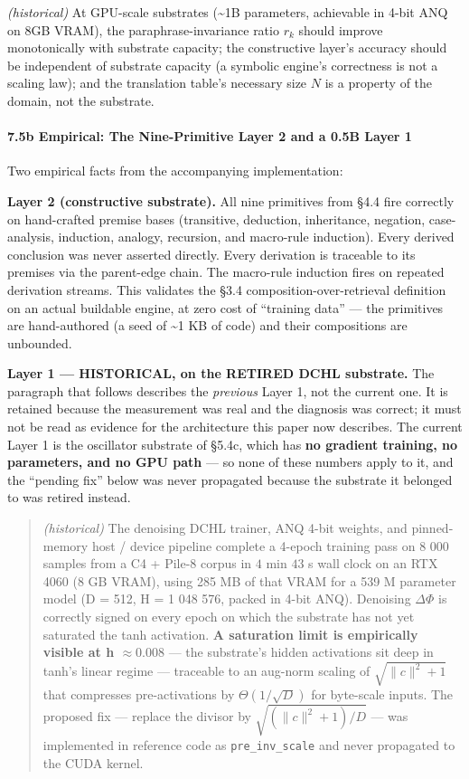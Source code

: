 \documentclass[
  11pt,
  a4paper,
]{article}
\begin{document}
\emph{(historical)} At GPU-scale substrates (\textasciitilde1B
parameters, achievable in 4-bit ANQ on 8GB VRAM), the
paraphrase-invariance ratio \(r_k\) should improve monotonically with
substrate capacity; the constructive layer's accuracy should be
independent of substrate capacity (a symbolic engine's correctness is
not a scaling law); and the translation table's necessary size \(N\) is
a property of the domain, not the substrate.

\paragraph{7.5b Empirical: The Nine-Primitive Layer 2 and a 0.5B Layer
1}\label{b-empirical-the-nine-primitive-layer-2-and-a-0.5b-layer-1}

Two empirical facts from the accompanying implementation:

\textbf{Layer 2 (constructive substrate).} All nine primitives from §4.4
fire correctly on hand-crafted premise bases (transitive, deduction,
inheritance, negation, case-analysis, induction, analogy, recursion, and
macro-rule induction). Every derived conclusion was never asserted
directly. Every derivation is traceable to its premises via the
parent-edge chain. The macro-rule induction fires on repeated derivation
streams. This validates the §3.4 composition-over-retrieval definition
on an actual buildable engine, at zero cost of ``training data'' --- the
primitives are hand-authored (a seed of \textasciitilde1 KB of code) and
their compositions are unbounded.

\textbf{Layer 1 --- HISTORICAL, on the RETIRED DCHL substrate.} The
paragraph that follows describes the \emph{previous} Layer 1, not the
current one. It is retained because the measurement was real and the
diagnosis was correct; it must not be read as evidence for the
architecture this paper now describes. The current Layer 1 is the
oscillator substrate of §5.4c, which has \textbf{no gradient training,
no parameters, and no GPU path} --- so none of these numbers apply to
it, and the ``pending fix'' below was never propagated because the
substrate it belonged to was retired instead.

\begin{quote}
\emph{(historical)} The denoising DCHL trainer, ANQ 4-bit weights, and
pinned-memory host / device pipeline complete a 4-epoch training pass on
8 000 samples from a C4 + Pile-8 corpus in \(4\) min \(43\) s wall clock
on an RTX 4060 (8 GB VRAM), using 285 MB of that VRAM for a 539 M
parameter model (D = 512, H = 1 048 576, packed in 4-bit ANQ). Denoising
\(\Delta\Phi\) is correctly signed on every epoch on which the substrate
has not yet saturated the tanh activation. \textbf{A saturation limit is
empirically visible at \textbar h\textbar{} \(\approx 0.008\)} --- the
substrate's hidden activations sit deep in tanh's linear regime ---
traceable to an aug-norm scaling of \(\sqrt{\lVert c\rVert^2 + 1}\) that
compresses pre-activations by \(\Theta(1/\sqrt{D})\) for byte-scale
inputs. The proposed fix --- replace the divisor by
\(\sqrt{(\lVert c\rVert^2 + 1)/D}\) --- was implemented in reference
code as \texttt{pre\_inv\_scale} and never propagated to the CUDA
kernel.
\end{quote}
\end{document}

